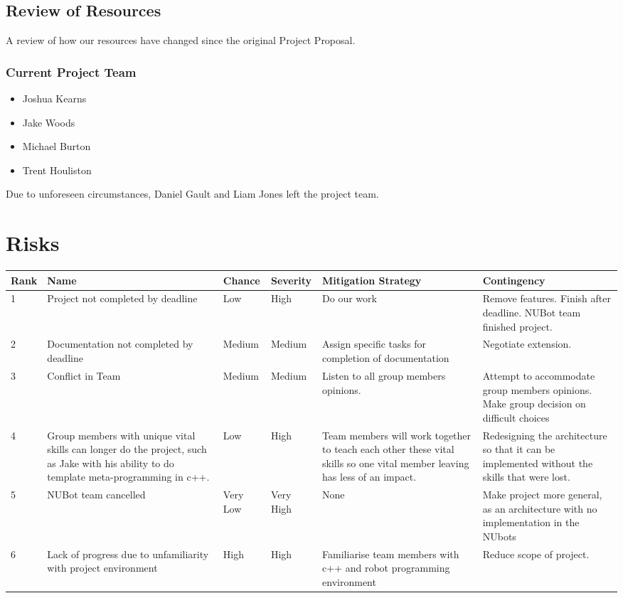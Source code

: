 \documentclass[english,12pt]{scrartcl}
\begin{document}
		\subsection {Review of Resources}
			A review of how our resources have changed since the original Project Proposal.
			\subsubsection{Current Project Team}
				\begin{itemize}
					\item Joshua Kearns
					\item Jake Woods
					\item Michael Burton
					\item Trent Houliston
				\end{itemize}
				Due to unforeseen circumstances, Daniel Gault and Liam Jones left the project team.

\newpage
	\section{Risks}
		\begin{table}[htbp]
		\begin{tabularx}{\linewidth}{ | m{0.6cm} |  X | m{1.05cm} |  m{1.05cm} |  X | X |}
			\hline 
			Rank & Name & Chance & Severity & Mitigation Strategy & Contingency \\  \hline
			1 & Project not completed by deadline & Low & High & Do our work & Remove features. Finish after deadline. NUBot team finished project. \\ \hline
			2 & Documentation not completed by deadline & Medium & Medium & Assign specific tasks for completion of documentation & Negotiate extension. \\ \hline
			3 & Conflict in Team & Medium & Medium & Listen to all group members opinions. & Attempt to accommodate group members opinions. Make group decision on difficult choices \\ \hline
			4 & Group members with unique vital skills can longer do the project, such as Jake with his ability to do template meta-programming in c++. & Low & High & Team members will work together to teach each other these vital skills so one vital member leaving has less of an impact. & Redesigning the architecture so that it can be implemented without the skills that were lost. \\ \hline
			5 & NUBot team cancelled & Very Low & Very High & None & Make project more general, as an architecture with no implementation in the NUbots \\ \hline
			6 & Lack of progress due to unfamiliarity with project environment & High & High & Familiarise team members with c++ and robot programming environment & Reduce scope of project. \\ \hline
		\end{tabularx}
		\end{table}
\end{document}
